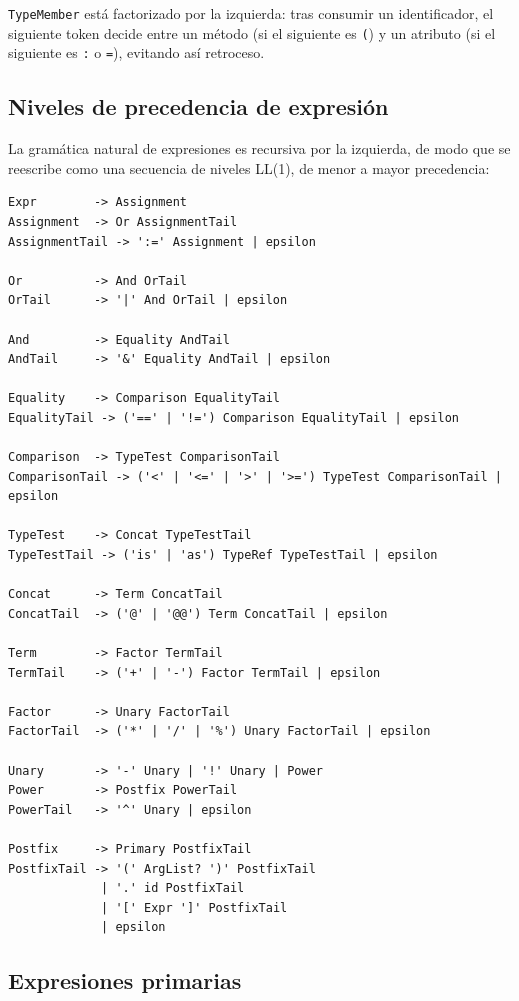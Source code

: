 \documentclass[12pt, a4paper]{article}
\begin{document}
\texttt{TypeMember} está factorizado por la izquierda: tras consumir un
identificador, el siguiente token decide entre un método (si el siguiente es
\texttt{(}) y un atributo (si el siguiente es \texttt{:} o \texttt{=}),
evitando así retroceso.

\subsection{Niveles de precedencia de expresión}

La gramática natural de expresiones es recursiva por la izquierda, de modo
que se reescribe como una secuencia de niveles LL(1), de menor a mayor
precedencia:

\begin{lstlisting}[language={}]
Expr        -> Assignment
Assignment  -> Or AssignmentTail
AssignmentTail -> ':=' Assignment | epsilon

Or          -> And OrTail
OrTail      -> '|' And OrTail | epsilon

And         -> Equality AndTail
AndTail     -> '&' Equality AndTail | epsilon

Equality    -> Comparison EqualityTail
EqualityTail -> ('==' | '!=') Comparison EqualityTail | epsilon

Comparison  -> TypeTest ComparisonTail
ComparisonTail -> ('<' | '<=' | '>' | '>=') TypeTest ComparisonTail | epsilon

TypeTest    -> Concat TypeTestTail
TypeTestTail -> ('is' | 'as') TypeRef TypeTestTail | epsilon

Concat      -> Term ConcatTail
ConcatTail  -> ('@' | '@@') Term ConcatTail | epsilon

Term        -> Factor TermTail
TermTail    -> ('+' | '-') Factor TermTail | epsilon

Factor      -> Unary FactorTail
FactorTail  -> ('*' | '/' | '%') Unary FactorTail | epsilon

Unary       -> '-' Unary | '!' Unary | Power
Power       -> Postfix PowerTail
PowerTail   -> '^' Unary | epsilon

Postfix     -> Primary PostfixTail
PostfixTail -> '(' ArgList? ')' PostfixTail
             | '.' id PostfixTail
             | '[' Expr ']' PostfixTail
             | epsilon
\end{lstlisting}

\subsection{Expresiones primarias}
\end{document}
